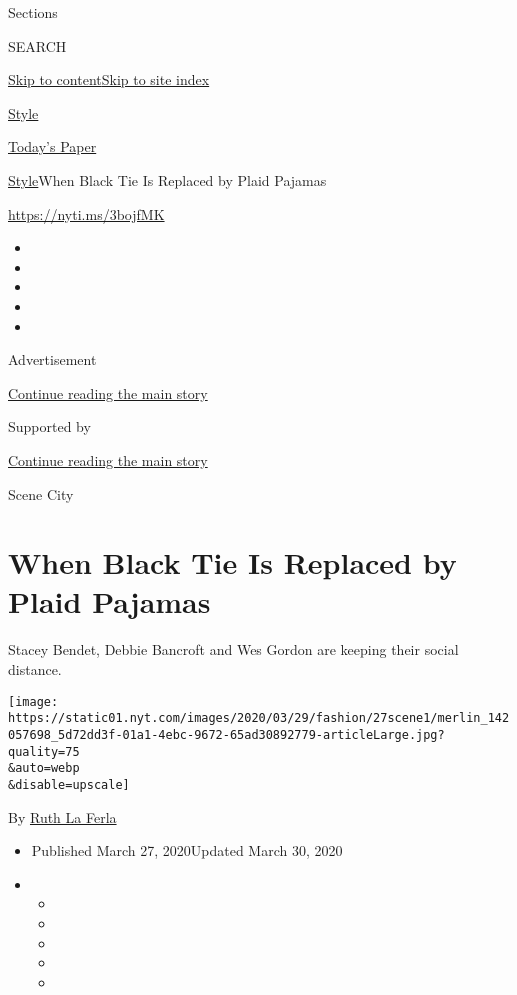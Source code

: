 Sections

SEARCH

\protect\hyperlink{site-content}{Skip to
content}\protect\hyperlink{site-index}{Skip to site index}

\href{https://www.nytimes.com/section/style}{Style}

\href{https://myaccount.nytimes.com/auth/login?response_type=cookie\&client_id=vi}{}

\href{https://www.nytimes.com/section/todayspaper}{Today's Paper}

\href{/section/style}{Style}\textbar{}When Black Tie Is Replaced by
Plaid Pajamas

\url{https://nyti.ms/3bojfMK}

\begin{itemize}
\item
\item
\item
\item
\item
\end{itemize}

Advertisement

\protect\hyperlink{after-top}{Continue reading the main story}

Supported by

\protect\hyperlink{after-sponsor}{Continue reading the main story}

Scene City

\hypertarget{when-black-tie-is-replaced-by-plaid-pajamas}{%
\section{When Black Tie Is Replaced by Plaid
Pajamas}\label{when-black-tie-is-replaced-by-plaid-pajamas}}

Stacey Bendet, Debbie Bancroft and Wes Gordon are keeping their social
distance.

\texttt{[image: https://static01.nyt.com/images/2020/03/29/fashion/27scene1/merlin\_142057698\_5d72dd3f-01a1-4ebc-9672-65ad30892779-articleLarge.jpg?quality=75\\\&auto=webp\\\&disable=upscale]}

By \href{https://www.nytimes.com/by/ruth-la-ferla}{Ruth La Ferla}

\begin{itemize}
\item
  Published March 27, 2020Updated March 30, 2020
\item
  \begin{itemize}
  \item
  \item
  \item
  \item
  \item
  \end{itemize}
\end{itemize}

